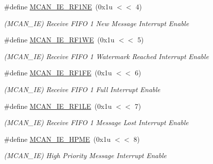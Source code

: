 \begin{DoxyCompactItemize}
\mbox{\label{group__SAMV71__MCAN_ga128e1078ae44d43fee9f447f2b99f869}} 
\#define \mbox{\hyperlink{group__SAMV71__MCAN_ga128e1078ae44d43fee9f447f2b99f869}{M\+C\+A\+N\+\_\+\+I\+E\+\_\+\+R\+F1\+NE}}~(0x1u $<$$<$ 4)
\begin{DoxyCompactList}\small\item\em (M\+C\+A\+N\+\_\+\+IE) Receive F\+I\+FO 1 New Message Interrupt Enable \end{DoxyCompactList}\item 
\mbox{\label{group__SAMV71__MCAN_ga2a330b1fc902eb510196a046ee59b293}} 
\#define \mbox{\hyperlink{group__SAMV71__MCAN_ga2a330b1fc902eb510196a046ee59b293}{M\+C\+A\+N\+\_\+\+I\+E\+\_\+\+R\+F1\+WE}}~(0x1u $<$$<$ 5)
\begin{DoxyCompactList}\small\item\em (M\+C\+A\+N\+\_\+\+IE) Receive F\+I\+FO 1 Watermark Reached Interrupt Enable \end{DoxyCompactList}\item 
\mbox{\label{group__SAMV71__MCAN_ga2ffb9516c3b68ac751bef7e91cbcf2f1}} 
\#define \mbox{\hyperlink{group__SAMV71__MCAN_ga2ffb9516c3b68ac751bef7e91cbcf2f1}{M\+C\+A\+N\+\_\+\+I\+E\+\_\+\+R\+F1\+FE}}~(0x1u $<$$<$ 6)
\begin{DoxyCompactList}\small\item\em (M\+C\+A\+N\+\_\+\+IE) Receive F\+I\+FO 1 Full Interrupt Enable \end{DoxyCompactList}\item 
\mbox{\label{group__SAMV71__MCAN_ga9677fc196338e0916ef21d3f850d893b}} 
\#define \mbox{\hyperlink{group__SAMV71__MCAN_ga9677fc196338e0916ef21d3f850d893b}{M\+C\+A\+N\+\_\+\+I\+E\+\_\+\+R\+F1\+LE}}~(0x1u $<$$<$ 7)
\begin{DoxyCompactList}\small\item\em (M\+C\+A\+N\+\_\+\+IE) Receive F\+I\+FO 1 Message Lost Interrupt Enable \end{DoxyCompactList}\item 
\mbox{\label{group__SAMV71__MCAN_gabf08bb232027e1c6f1a41856b9c64600}} 
\#define \mbox{\hyperlink{group__SAMV71__MCAN_gabf08bb232027e1c6f1a41856b9c64600}{M\+C\+A\+N\+\_\+\+I\+E\+\_\+\+H\+P\+ME}}~(0x1u $<$$<$ 8)
\begin{DoxyCompactList}\small\item\em (M\+C\+A\+N\+\_\+\+IE) High Priority Message Interrupt Enable \end{DoxyCompactList}\item 
$$
\end{DoxyCompactItemize}
